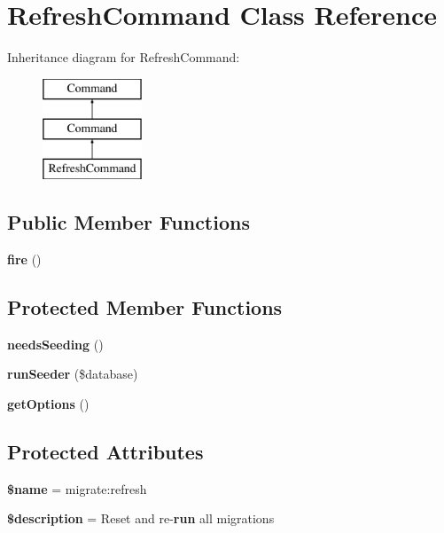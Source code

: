 \section{Refresh\+Command Class Reference}
\label{class_illuminate_1_1_database_1_1_console_1_1_migrations_1_1_refresh_command}
Inheritance diagram for Refresh\+Command\+:\begin{figure}[H]
\begin{center}
\leavevmode
\includegraphics[height=3.000000cm]{class_illuminate_1_1_database_1_1_console_1_1_migrations_1_1_refresh_command}
\end{center}
\end{figure}
\subsection*{Public Member Functions}
\begin{DoxyCompactItemize}
\item 
{\bf fire} ()
\end{DoxyCompactItemize}
\subsection*{Protected Member Functions}
\begin{DoxyCompactItemize}
\item 
{\bf needs\+Seeding} ()
\item 
{\bf run\+Seeder} (\$database)
\item 
{\bf get\+Options} ()
\end{DoxyCompactItemize}
\subsection*{Protected Attributes}
\begin{DoxyCompactItemize}
\item 
{\bf \$name} = \textquotesingle{}migrate\+:refresh\textquotesingle{}
\item 
{\bf \$description} = \textquotesingle{}Reset and re-\/{\bf run} all migrations\textquotesingle{}
\end{DoxyCompactItemize}


